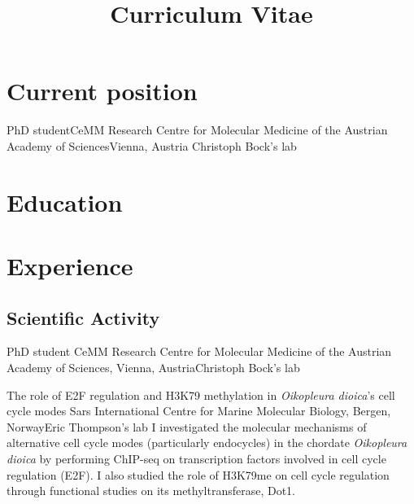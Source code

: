 \documentclass[11pt,a4paper,roman]{moderncv} %
\title{Curriculum Vitae}
\begin{document}
\makecvtitle %


\section{Current position}
	{PhD student}{CeMM Research Centre for Molecular Medicine of the Austrian Academy of Sciences}{Vienna, Austria}
	{Christoph Bock's lab}{}


\section{Education}


\section{Experience}

	\subsection{Scientific Activity}

		{PhD student}
		{CeMM Research Centre for Molecular Medicine of the Austrian Academy of Sciences, Vienna, Austria}{Christoph Bock's lab}
		{}
		{}
	
		{The role of E2F regulation and H3K79 methylation in \textit{Oikopleura dioica}'s cell cycle modes}
		{Sars International Centre for Marine Molecular Biology, Bergen, Norway}{Eric Thompson's lab}
		{}
		{I investigated the molecular mechanisms of alternative cell cycle modes (particularly endocycles) in the chordate \textit{Oikopleura dioica} by performing ChIP-seq on transcription factors involved in cell cycle regulation (E2F). I also studied the role of H3K79me on cell cycle regulation through functional studies on its methyltransferase, Dot1.}
	
\end{document}
